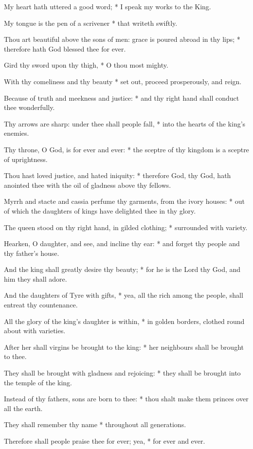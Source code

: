 ﻿\item My heart hath uttered a good word; * I speak my works to the King.
\item My tongue is the pen of a scrivener * that writeth swiftly.
\item Thou art beautiful above the sons of men: grace is poured abroad in thy lips; * therefore hath God blessed thee for ever.
\item Gird thy sword upon thy thigh, * O thou most mighty.
\item With thy comeliness and thy beauty * set out, proceed prosperously, and reign.
\item Because of truth and meekness and justice: * and thy right hand shall conduct thee wonderfully.
\item Thy arrows are sharp: under thee shall people fall, * into the hearts of the king's enemies.
\item Thy throne, O God, is for ever and ever: * the sceptre of thy kingdom is a sceptre of uprightness.
\item Thou hast loved justice, and hated iniquity: * therefore God, thy God, hath anointed thee with the oil of gladness above thy fellows.
\item Myrrh and stacte and cassia perfume thy garments, from the ivory houses: * out of which the daughters of kings have delighted thee in thy glory.
\item The queen stood on thy right hand, in gilded clothing; * surrounded with variety.
\item Hearken, O daughter, and see, and incline thy ear: * and forget thy people and thy father's house.
\item And the king shall greatly desire thy beauty; * for he is the Lord thy God, and him they shall adore.
\item And the daughters of Tyre with gifts, * yea, all the rich among the people, shall entreat thy countenance.
\item All the glory of the king's daughter is within, * in golden borders, clothed round about with varieties.
\item After her shall virgins be brought to the king: * her neighbours shall be brought to thee.
\item They shall be brought with gladness and rejoicing: * they shall be brought into the temple of the king.
\item Instead of thy fathers, sons are born to thee: * thou shalt make them princes over all the earth.
\item They shall remember thy name * throughout all generations.
\item Therefore shall people praise thee for ever; yea, * for ever and ever.